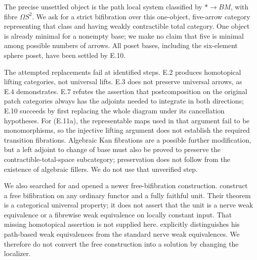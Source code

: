 The precise unsettled object is the path local system classified by
$*\to BM$, with fibre $\Omega S^2$. We ask for a strict bifibration over
this one-object, five-arrow category representing that class and having
weakly contractible total category. One object is already minimal for
a nonempty base; we make no claim that five is minimal among possible
numbers of arrows. All poset bases, including the six-element sphere
poset, have been settled by E.10.

The attempted replacements fail at identified steps. E.2 produces homotopical lifting categories, not universal lifts. E.3 does not preserve universal arrows, as E.4 demonstrates. E.7 refutes the assertion that postcomposition on the original patch categories always has the adjoints needed to integrate in both directions; E.10 succeeds by first replacing the whole diagram under its cancellation hypotheses. For (E.11a), the representable maps used in that argument fail to be monomorphisms, so the injective lifting argument does not establish the required transition fibrations. Algebraic Kan fibrations are a possible further modification, but a left adjoint to change of base must also be proved to preserve the contractible-total-space subcategory; preservation does not follow from the existence of algebraic fillers. We do not use that unverified step.

We also searched for and opened a newer free-bifibration construction. \citet[Theorem~1.17 and Propositions~1.23--1.24]{E_ClarkeSchererZeilberger2026} construct a free bifibration on any ordinary functor and a fully faithful unit. Their theorem is a categorical universal property; it does not assert that the unit is a nerve weak equivalence or a fibrewise weak equivalence on locally constant input. That missing homotopical assertion is not supplied here. \citet[\S4]{E_Lamarche2013} explicitly distinguishes his path-based weak equivalences from the standard nerve weak equivalences. We therefore do not convert the free construction into a solution by changing the localizer.

